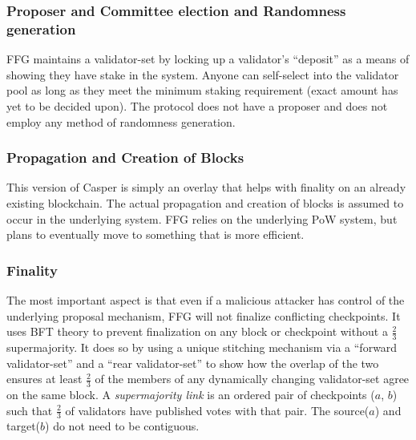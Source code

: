 \documentclass[10pt,journal,compsoc]{IEEEtran}
\begin{document}
\subsubsection{Proposer and Committee election and Randomness generation}
FFG maintains a validator-set by locking up a validator’s “deposit” as a means of showing they have stake in the system. Anyone can self-select into the validator pool as long as they meet the minimum staking requirement (exact amount has yet to be decided upon). The protocol does not have a proposer and does not employ any method of randomness generation.

\subsubsection{Propagation and Creation of Blocks}
This version of Casper is simply an overlay that helps with finality on an already existing blockchain. The actual propagation and creation of blocks is assumed to occur in the underlying system. FFG relies on the underlying PoW system, but plans to eventually move to something that is more efficient.

\subsubsection{Finality}
The most important aspect is that even if a malicious attacker has control of the underlying proposal mechanism, FFG will not finalize conflicting checkpoints. It uses BFT theory to prevent finalization on any block or checkpoint without a \(\frac{2}{3}\) supermajority. It does so by using a unique stitching mechanism via a “forward validator-set” and a “rear validator-set” to show how the overlap of the two ensures at least \(\frac{2}{3}\) of the members of any dynamically changing validator-set agree on the same block. A \emph{supermajority link} is an ordered pair of checkpoints ($a$, $b$) such that \(\frac{2}{3}\) of validators have published votes with that pair. The source($a$) and target($b$) do not need to be contiguous. 
\end{document}
